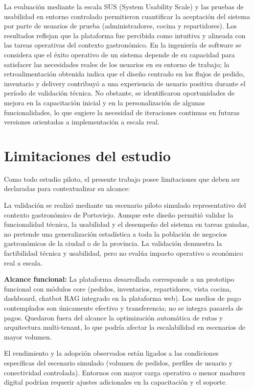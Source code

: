 La evaluación mediante la escala SUS (System Usability Scale) y las pruebas de usabilidad en entorno controlado permitieron cuantificar la aceptación del sistema por parte de usuarios de prueba (administradores, cocina y repartidores). Los resultados reflejan que la plataforma fue percibida como intuitiva y alineada con las tareas operativas del contexto gastronómico. En la ingeniería de software se considera que el éxito operativo de un sistema depende de su capacidad para satisfacer las necesidades reales de los usuarios en su entorno de trabajo; la retroalimentación obtenida indica que el diseño centrado en los flujos de pedido, inventario y delivery contribuyó a una experiencia de usuario positiva durante el período de validación técnica. No obstante, se identificaron oportunidades de mejora en la capacitación inicial y en la personalización de algunas funcionalidades, lo que sugiere la necesidad de iteraciones continuas en futuras versiones orientadas a implementación a escala real.

\section{Limitaciones del estudio}

Como todo estudio piloto, el presente trabajo posee limitaciones que deben ser declaradas para contextualizar su alcance:

 La validación se realizó mediante un escenario piloto simulado representativo del contexto gastronómico de Portoviejo. Aunque este diseño permitió validar la funcionalidad técnica, la usabilidad y el desempeño del sistema en tareas guiadas, no pretende una generalización estadística a toda la población de negocios gastronómicos de la ciudad o de la provincia. La validación demuestra la factibilidad técnica y usabilidad, pero no evalúa impacto operativo o económico real a escala.

\textbf{Alcance funcional:} La plataforma desarrollada corresponde a un prototipo funcional con módulos core (pedidos, inventarios, repartidores, vista cocina, dashboard, chatbot RAG integrado en la plataforma web). Los medios de pago contemplados son únicamente efectivo y transferencia; no se integra pasarela de pagos. Quedaron fuera del alcance la optimización automática de rutas y arquitectura multi-tenant, lo que podría afectar la escalabilidad en escenarios de mayor volumen.

 El rendimiento y la adopción observados están ligados a las condiciones específicas del escenario simulado (volumen de pedidos, perfiles de usuario y conectividad controlada). Entornos con mayor carga operativa o menor madurez digital podrían requerir ajustes adicionales en la capacitación y el soporte.

